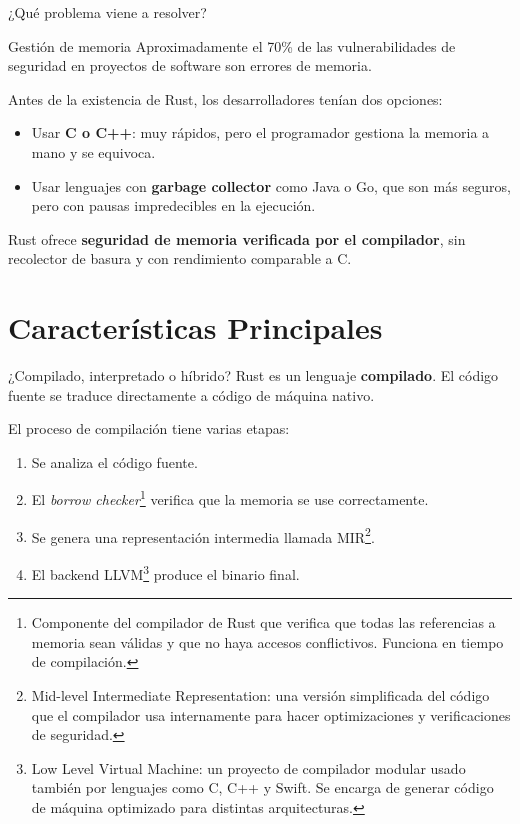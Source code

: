 \documentclass[11pt, aspectratio=169]{beamer}
\begin{document}
	\begin{frame}{¿Qué problema viene a resolver?}
		\begin{alertblock}{Gestión de memoria}
			Aproximadamente el 70\% de las vulnerabilidades de seguridad en proyectos de software son errores de memoria.
		\end{alertblock}
		
		\vspace{0.3cm}
		
		Antes de la existencia de Rust, los desarrolladores tenían dos opciones:
		\begin{itemize}
			\item Usar \textbf{C o C++}: muy rápidos, pero el programador gestiona la memoria a mano y se equivoca.
			\item Usar lenguajes con \textbf{garbage collector} como Java o Go, que son más seguros, pero con pausas impredecibles en la ejecución.
		\end{itemize}
		
		\vspace{0.2cm}
		Rust ofrece \textbf{seguridad de memoria verificada por el compilador}, sin recolector de basura y con rendimiento comparable a C.
	\end{frame}

	\section{Características Principales}

	\begin{frame}{¿Compilado, interpretado o híbrido?}
		Rust es un lenguaje \textbf{compilado}. El código fuente se traduce directamente a código de máquina nativo.
		
		\vspace{0.4cm}
		El proceso de compilación tiene varias etapas:
		\begin{enumerate}
			\item Se analiza el código fuente.
			\item El \textit{borrow checker}\footnote{Componente del compilador de Rust que verifica que todas las referencias a memoria sean válidas y que no haya accesos conflictivos. Funciona en tiempo de compilación.} verifica que la memoria se use correctamente.
			\item Se genera una representación intermedia llamada MIR\footnote{Mid-level Intermediate Representation: una versión simplificada del código que el compilador usa internamente para hacer optimizaciones y verificaciones de seguridad.}.
			\item El backend LLVM\footnote{Low Level Virtual Machine: un proyecto de compilador modular usado también por lenguajes como C, C++ y Swift. Se encarga de generar código de máquina optimizado para distintas arquitecturas.} produce el binario final.
		\end{enumerate}
	\end{frame}
\end{document}
